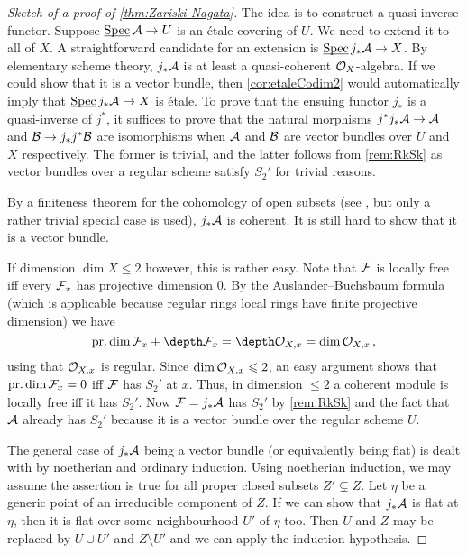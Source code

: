 \begin{proof}[Sketch of a proof of \cref{thm:Zariski-Nagata}]
	The idea is to construct a quasi-inverse functor. Suppose $\SPEC\Aa\morphism U$ is an étale covering of $U$. We need to extend it to all of $X$. A straightforward candidate for an extension is $\SPEC j_*\Aa\morphism X$. By elementary scheme theory, $j_*\mathcal{A}$ is at least a quasi-coherent $\mathcal{O}_X$-algebra. If we could show that it is a vector bundle, then \cref{cor:etaleCodim2} would automatically imply that $\SPEC j_*\Aa\morphism X$ is étale. To prove that the ensuing functor $j_*$ is a quasi-inverse of $j^*$, it suffices to prove that the natural morphisms $j^*j_*\Aa\morphism \Aa$ and $\Bb\morphism j_*j^*\Bb$ are isomorphisms when $\mathcal{A}$ and $\mathcal{B}$ are vector bundles over $U$ and $X$ respectively. The former is trivial, and the latter follows from \cref{rem:RkSk} as vector bundles over a regular scheme satisfy $S_2'$ for trivial reasons.
	
	By  a finiteness theorem for the cohomology of open subsets (see \cite[Exposé~VIII Proposition~3.2]{sga2}, but only a rather trivial special case is used), $j_*\mathcal{A}$ is coherent. It is still hard to show that it is a vector bundle.
	
	If dimension $\dim X\leq 2$ however, this is rather easy. Note that $\mathcal{F}$ is locally free iff every $\mathcal{F}_x$ has projective dimension $0$. By the Auslander--Buchsbaum formula (which is applicable because regular rings local rings have finite projective dimension) we have
	\begin{equation*}
		\pdim \Ff_x+\depth \Ff_x=\depth \Oo_{X,x}=\dim \Oo_{X,x}\,,
	\end{equation*}
	using that $\mathcal{O}_{X,x}$ is regular. Since $\dim \mathcal{O}_{X,x}\leqslant 2$, an easy argument shows that $\operatorname{pr.dim} \mathcal{F}_x=0$ iff $\mathcal{F}$ has $S_2'$ at $x$. Thus, in dimension $\leq 2$ a coherent module is locally free iff it has $S_2'$. Now $\mathcal{F}=j_*\mathcal{A}$ has $S_2'$ by \cref{rem:RkSk} and the fact that $\mathcal{A}$ already has $S_2'$ because it is a vector bundle over the regular scheme $U$.
	
	The general case of $j_*\mathcal{A}$ being a vector bundle (or equivalently being flat) is dealt with by noetherian and ordinary induction. Using noetherian induction, we may assume the assertion is true for all proper closed subsets $Z'\subsetneq Z$. Let $\eta$ be a generic point of an irreducible component of $Z$. If we can show that $j_*\mathcal{A}$ is flat at $\eta$, then it is flat over some neighbourhood $U'$ of $\eta$ too. Then $U$ and $Z$ may be replaced by $U\cup U'$ and $Z\setminus U'$ and we can apply the induction hypothesis.
	

\end{proof}
